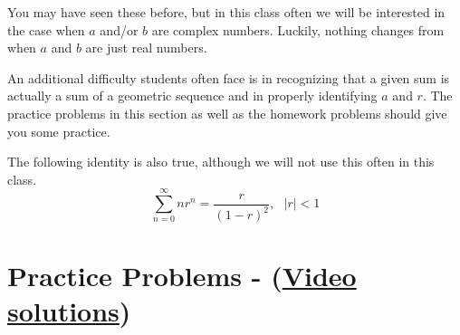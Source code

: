 You may have seen these before, but in this class often we will be interested in the case when $a$ and/or $b$ are complex numbers. Luckily, nothing changes from when $a$ and $b$ are just real numbers.


An additional difficulty students often face is in recognizing that a given sum is actually a sum of a geometric sequence and in properly identifying $a$ and $r$. The practice problems in this section as well as the homework problems should give you some practice.

The following identity is also true, although we will not use this often in this class.
\begin{equation}
\label{sumgm2}
\sum_{n=0}^\infty n r^n = \frac{r}{(1-r)^2}, \ \ \ |r| < 1
\end{equation}

\section{Practice Problems -
(\href{http://signalsandsystems.wikidot.com/problems-geometric-series}{Video solutions})}

